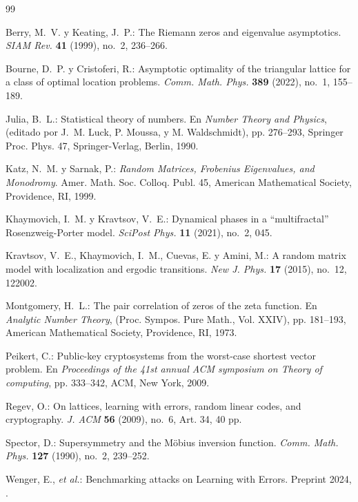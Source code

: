 \documentclass{article}
\numberwithin{equation}{section}
\theoremstyle{plain}
\theoremstyle{definition}
\begin{document}
\begin{thebibliography}{99}

Berry, M.~V. y Keating, J.~P.: 
The Riemann zeros and eigenvalue asymptotics. 
\emph{SIAM Rev.} \textbf{41} (1999), no.~2, 236--266.

Bourne, D.~P. y Cristoferi, R.: 
Asymptotic optimality of the triangular lattice for a class of optimal location problems. 
\emph{Comm. Math. Phys.} \textbf{389} (2022), no.~1, 155--189.

Julia, B.~L.: 
Statistical theory of numbers. 
En \emph{Number Theory and Physics}, (editado por J.~M. Luck, P. Moussa, y M. Waldschmidt), 
pp. 276--293, Springer Proc. Phys. 47, Springer-Verlag, Berlin, 1990.

Katz, N.~M. y Sarnak, P.: 
\emph{Random Matrices, Frobenius Eigenvalues, and Monodromy}. 
Amer. Math. Soc. Colloq. Publ. 45, American Mathematical Society, Providence, RI, 1999.

Khaymovich, I.~M. y Kravtsov, V.~E.: 
Dynamical phases in a ``multifractal'' Rosenzweig-Porter model. 
\emph{SciPost Phys.} \textbf{11} (2021), no.~2, 045.

Kravtsov, V.~E., Khaymovich, I.~M., Cuevas, E. y Amini, M.: 
A random matrix model with localization and ergodic transitions. 
\emph{New J. Phys.} \textbf{17} (2015), no.~12, 122002.

Montgomery, H.~L.: 
The pair correlation of zeros of the zeta function. 
En \emph{Analytic Number Theory}, (Proc. Sympos. Pure Math., Vol. XXIV), 
pp. 181--193, American Mathematical Society, Providence, RI, 1973.

Peikert, C.: 
Public-key cryptosystems from the worst-case shortest vector problem. 
En \emph{Proceedings of the 41st annual ACM symposium on Theory of computing}, 
pp. 333--342, ACM, New York, 2009.

Regev, O.: 
On lattices, learning with errors, random linear codes, and cryptography. 
\emph{J. ACM} \textbf{56} (2009), no.~6, Art. 34, 40 pp.

Spector, D.: 
Supersymmetry and the M\"{o}bius inversion function. 
\emph{Comm. Math. Phys.} \textbf{127} (1990), no.~2, 239--252.

Wenger, E., \emph{et al.}: 
Benchmarking attacks on Learning with Errors. 
Preprint 2024, .

\end{thebibliography}
\end{document}
